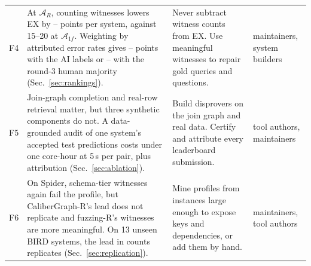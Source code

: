 {\begin{xltabular}{\textwidth}{@{}l >{\raggedright\arraybackslash}X >{\raggedright\arraybackslash}p{0.27\textwidth} >{\raggedright\arraybackslash}p{0.13\textwidth}@{}}
F4 & At $\mathcal A_R$, counting witnesses lowers EX by -- points per system, against 15--20 at $\mathcal A_{1f}$. Weighting by attributed error rates gives -- points with the AI labels or -- with the round-3 human majority (Sec.~\ref{sec:rankings}). & Never subtract witness counts from EX. Use meaningful witnesses to repair gold queries and questions. & maintainers, system builders\\\addlinespace
F5 & Join-graph completion and real-row retrieval matter, but three synthetic components do not. A data-grounded audit of one system's accepted test predictions costs under one core-hour at 5\,s per pair, plus attribution (Sec.~\ref{sec:ablation}). & Build disprovers on the join graph and real data. Certify and attribute every leaderboard submission. & tool authors, maintainers\\\addlinespace
F6 & On Spider, schema-tier witnesses again fail the profile, but CaliberGraph-R's lead does not replicate and fuzzing-R's witnesses are more meaningful. On 13 unseen BIRD systems, the lead in counts replicates (Sec.~\ref{sec:replication}). & Mine profiles from instances large enough to expose keys and dependencies, or add them by hand. & maintainers, tool authors\\
\end{xltabular}
}
